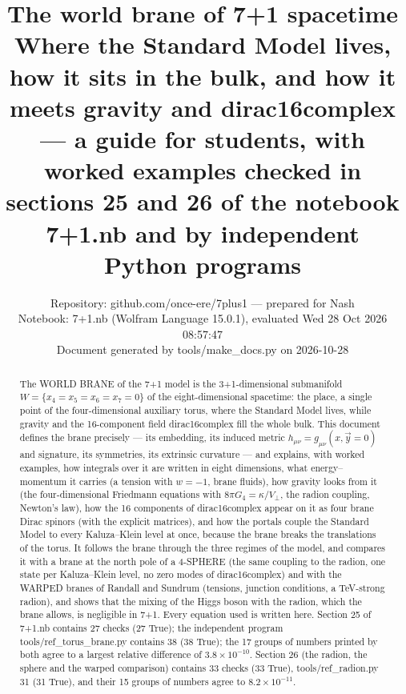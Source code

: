 \documentclass[10pt,a4paper]{article}
\begin{document}
\title{The world brane of 7+1 spacetime\\[0.4em]\large Where the Standard Model lives, how it sits in the bulk, and how it meets gravity and dirac16complex — a guide for students, with worked examples checked in sections 25 and 26 of the notebook 7+1.nb and by independent Python programs}
\author{Repository: github.com/once-ere/7plus1 — prepared for Nash\\ Notebook: 7+1.nb (Wolfram Language 15.0.1), evaluated Wed 28 Oct 2026 08:57:47\\ Document generated by tools/make\_docs.py on 2026-10-28}
\date{}
\maketitle
\begin{abstract}
The WORLD BRANE of the 7+1 model is the 3+1-dimensional submanifold $W=\{x_4=x_5=x_6=x_7=0\}$ of the eight-dimensional spacetime: the place, a single point of the four-dimensional auxiliary torus, where the Standard Model lives, while gravity and the 16-component field dirac16complex fill the whole bulk. This document defines the brane precisely — its embedding, its induced metric $h_{\mu\nu}=g_{\mu\nu}(x,\vec y=0)$ and signature, its symmetries, its extrinsic curvature — and explains, with worked examples, how integrals over it are written in eight dimensions, what energy–momentum it carries (a tension with $w=-1$, brane fluids), how gravity looks from it (the four-dimensional Friedmann equations with $8\pi G_4=\kappa/V_\perp$, the radion coupling, Newton’s law), how the 16 components of dirac16complex appear on it as four brane Dirac spinors (with the explicit matrices), and how the portals couple the Standard Model to every Kaluza–Klein level at once, because the brane breaks the translations of the torus. It follows the brane through the three regimes of the model, and compares it with a brane at the north pole of a 4-SPHERE (the same coupling to the radion, one state per Kaluza–Klein level, no zero modes of dirac16complex) and with the WARPED branes of Randall and Sundrum (tensions, junction conditions, a TeV-strong radion), and shows that the mixing of the Higgs boson with the radion, which the brane allows, is negligible in 7+1. Every equation used is written here. Section 25 of 7+1.nb contains 27 checks (27 True); the independent program tools/ref\_torus\_brane.py contains 38 (38 True); the 17 groups of numbers printed by both agree to a largest relative difference of $3.8\times10^{-10}$. Section 26 (the radion, the sphere and the warped comparison) contains 33 checks (33 True), tools/ref\_radion.py 31 (31 True), and their 15 groups of numbers agree to $8.2\times10^{-11}$.
\end{abstract}
\end{document}
